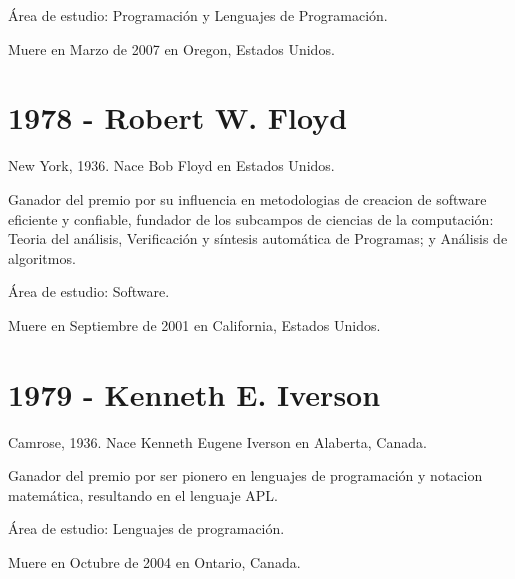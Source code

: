 \documentclass[a4paper, 11pt]{article}
\begin{document}
\noindent Área de estudio: Programación y Lenguajes de Programación.

\noindent Muere en Marzo de 2007 en Oregon, Estados Unidos.
\newline

\section*{1978 - Robert W. Floyd}
\noindent New York, 1936. Nace Bob Floyd en Estados Unidos.

\noindent Ganador del premio por su influencia en metodologias de creacion de software eficiente y confiable, fundador de los subcampos de ciencias de la computación: Teoria del análisis, Verificación y síntesis automática de Programas; y Análisis de algoritmos. 

\noindent Área de estudio: Software.

\noindent Muere en Septiembre de 2001 en California, Estados Unidos.
\newline

\section*{1979 - Kenneth E. Iverson}
\noindent Camrose, 1936. Nace Kenneth Eugene Iverson en Alaberta, Canada.

\noindent Ganador del premio por ser pionero en lenguajes de programación y notacion matemática, resultando en el lenguaje APL.

\noindent Área de estudio: Lenguajes de programación.

\noindent Muere en Octubre de 2004 en Ontario, Canada.
\newline
\end{document}
